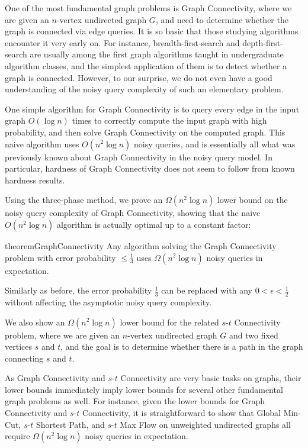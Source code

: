 One of the most fundamental graph problems is Graph Connectivity, where we are given an $n$-vertex undirected graph $G$, and need to determine whether the graph is connected via edge queries. It is so basic that those studying algorithms encounter it very early on. For instance, breadth-first-search and depth-first-search are usually among the first graph algorithms taught in undergraduate algorithm classes, and the simplest application of them is to detect whether a graph is connected. However, to our surprise, we do not even have a good understanding of the noisy query complexity of such an elementary problem.

One simple algorithm for Graph Connectivity is to query every edge in the input graph $O(\log n)$ times to correctly compute the input graph with high probability, and then solve Graph Connectivity on the computed graph. This naive algorithm uses $O(n^2 \log n)$ noisy queries, and is essentially all what was previously known about Graph Connectivity in the noisy query model.
In particular, hardness of Graph Connectivity does not seem to follow from known hardness results. %

Using the three-phase method, we prove an $\Omega(n^2 \log n)$ lower bound on the noisy query complexity of Graph Connectivity, showing that the naive $O(n^2 \log n)$ algorithm is actually optimal up to a constant factor:



\begin{restatable}{theorem}{GraphConnectivity}\label{thm:graph-conn-hard}
  Any algorithm solving the Graph Connectivity problem with error probability $\le \frac 13$ uses $\Omega(n^2\log n)$ noisy queries in expectation.
\end{restatable}
Similarly as before, the error probability $\frac 13$ can be replaced with any $0<\epsilon<\frac 12$ without affecting the asymptotic noisy query complexity.



We also show an $\Omega(n^2 \log n)$ lower bound for the related $s$-$t$ Connectivity problem, where we are given an $n$-vertex undirected graph $G$ and two fixed vertices $s$ and $t$, and the goal is to determine whether there is a path in the graph connecting $s$ and $t$.


As Graph Connectivity and $s$-$t$ Connectivity are very basic tasks on graphs, their lower bounds immediately imply lower bounds for several other fundamental graph problems as well. For instance, given the lower bounds for Graph Connectivity and $s$-$t$ Connectivity, it is straightforward to show that Global Min-Cut, $s$-$t$ Shortest Path, and $s$-$t$ Max Flow on unweighted undirected graphs all require $\Omega(n^2 \log n)$ noisy queries in expectation.


